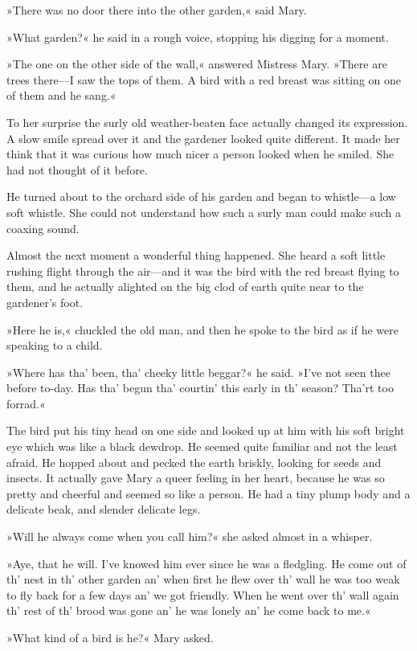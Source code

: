 »There was no door there into the other garden,« said Mary.

»What garden?« he said in a rough voice, stopping his digging for a moment.

»The one on the other side of the wall,« answered Mistress Mary. »There are trees there—I saw the tops of them. A bird with a red breast was sitting on one of them and he sang.«

To her surprise the surly old weather-beaten face actually changed its expression. A slow smile spread over it and the gardener looked quite different. It made her think that it was curious how much nicer a person looked when he smiled. She had not thought of it before.

He turned about to the orchard side of his garden and began to whistle—a low soft whistle. She could not understand how such a surly man could make such a coaxing sound.

Almost the next moment a wonderful thing happened. She heard a soft little rushing flight through the air—and it was the bird with the red breast flying to them, and he actually alighted on the big clod of earth quite near to the gardener's foot.

»Here he is,« chuckled the old man, and then he spoke to the bird as if he were speaking to a child.

»Where has tha' been, tha' cheeky little beggar?« he said. »I've not seen thee before to-day. Has tha' begun tha' courtin' this early in th' season? Tha'rt too forrad.«

The bird put his tiny head on one side and looked up at him with his soft bright eye which was like a black dewdrop. He seemed quite familiar and not the least afraid. He hopped about and pecked the earth briskly, looking for seeds and insects. It actually gave Mary a queer feeling in her heart, because he was so pretty and cheerful and seemed so like a person. He had a tiny plump body and a delicate beak, and slender delicate legs.

»Will he always come when you call him?« she asked almost in a whisper.

»Aye, that he will. I've knowed him ever since he was a fledgling. He come out of th' nest in th' other garden an' when first he flew over th' wall he was too weak to fly back for a few days an' we got friendly. When he went over th' wall again th' rest of th' brood was gone an' he was lonely an' he come back to me.«

»What kind of a bird is he?« Mary asked.

